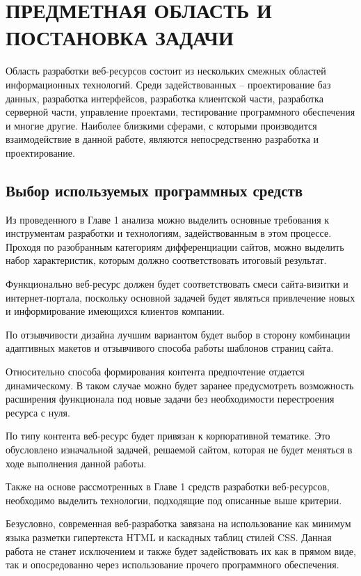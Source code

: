 \section{ПРЕДМЕТНАЯ ОБЛАСТЬ И ПОСТАНОВКА ЗАДАЧИ}

Область разработки веб-ресурсов состоит из нескольких смежных областей информационных технологий.
Среди задействованных -- проектирование баз данных, разработка интерфейсов, разработка клиентской части, разработка серверной части, управление проектами, тестирование программного обеспечения и многие другие.
Наиболее близкими сферами, с которыми производится взаимодействие в данной работе, являются непосредственно разработка и проектирование.

\subsection{Выбор используемых программных средств}

Из проведенного в Главе 1 анализа можно выделить основные требования к инструментам разработки и технологиям, задействованным в этом процессе.
Проходя по разобранным категориям дифференциации сайтов, можно выделить набор характеристик, которым должно соответствовать итоговый результат.

Функционально веб-ресурс должен будет соответствовать смеси сайта-визитки и интернет-портала, поскольку основной задачей будет являться привлечение новых и информирование имеющихся клиентов компании.

По отзывчивости дизайна лучшим вариантом будет выбор в сторону комбинации адаптивных макетов и отзывчивого способа работы шаблонов страниц сайта.

Относительно способа формирования контента предпочтение отдается динамическому.
В таком случае можно будет заранее предусмотреть возможность расширения функционала под новые задачи без необходимости перестроения ресурса с нуля.

По типу контента веб-ресурс будет привязан к корпоративной тематике.
Это обусловлено изначальной задачей, решаемой сайтом, которая не будет меняться в ходе выполнения данной работы.

Также на основе рассмотренных в Главе 1 средств разработки веб-ресурсов, необходимо выделить технологии, подходящие под описанные выше критерии.

Безусловно, современная веб-разработка завязана на использование как минимум языка разметки гипертекста HTML и каскадных таблиц стилей CSS.
Данная работа не станет исключением и также будет задействовать их как в прямом виде, так и опосредованно через использование прочего программного обеспечения.

